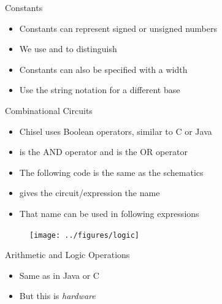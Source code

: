 \begin{frame}[fragile]{Constants}
\begin{itemize}
\item Constants can represent signed or unsigned numbers
\item We use  and  to distinguish
\end{itemize}
\begin{itemize}
\item Constants can also be specified with a width
\end{itemize}
\begin{itemize}
\item Use the string notation for a different base
\end{itemize}
\end{frame}

\begin{frame}[fragile]{Combinational Circuits}
\begin{itemize}
\item Chisel uses Boolean operators, similar to C or Java
\item \code{\&} is the AND operator and \code{|} is the OR operator
\item The following code is the same as the schematics
\item {} gives the circuit/expression the name 
\item That name can be used in following expressions
\end{itemize}
\begin{figure}
  \texttt{[image: ../figures/logic]}
\end{figure}
\end{frame}


\begin{frame}[fragile]{Arithmetic and Logic Operations}
\begin{itemize}
\item Same as in Java or C
\item But this is \emph{hardware}
\end{itemize}
\end{frame}

